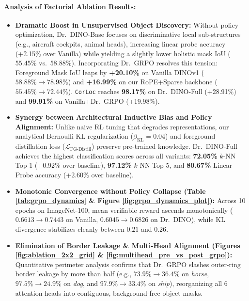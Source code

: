 \documentclass[11pt,a4paper]{article}
\begin{document}
\paragraph{Analysis of Factorial Ablation Results:}
\begin{itemize}[leftmargin=*]
    \item \textbf{Dramatic Boost in Unsupervised Object Discovery:} Without policy optimization, Dr.\ DINO-Base focuses on discriminative local sub-structures (e.g., aircraft cockpits, animal heads), increasing linear probe accuracy (+2.15\% over Vanilla) while yielding a slightly lower holistic mask IoU ($55.45\%$ vs.\ $58.88\%$). Incorporating Dr.\ GRPO resolves this tension: Foreground Mask IoU leaps by \textbf{+20.10\%} on Vanilla DINOv1 ($58.88\% \to 78.98\%$) and \textbf{+16.99\%} on our RoPE+Sparse backbone ($55.45\% \to 72.44\%$). \texttt{CorLoc} reaches \textbf{98.17\%} on Dr.\ DINO-Full (+28.91\%) and \textbf{99.91\%} on Vanilla+Dr.\ GRPO (+19.98\%).
    \item \textbf{Synergy between Architectural Inductive Bias and Policy Alignment:} Unlike naive RL tuning that degrades representations, our analytical Bernoulli KL regularization ($\beta_{\text{KL}}=0.04$) and foreground distillation loss ($\mathcal{L}_{\text{FG-Distill}}$) preserve pre-trained knowledge. Dr.\ DINO-Full achieves the highest classification scores across all variants: \textbf{72.05\%} $k$-NN Top-1 (+0.92\% over baseline), \textbf{97.12\%} $k$-NN Top-5, and \textbf{80.67\%} Linear Probe accuracy (+2.60\% over baseline).
    \item \textbf{Monotonic Convergence without Policy Collapse (Table \ref{tab:grpo_dynamics} \& Figure \ref{fig:grpo_dynamics_plot}):} Across 10 epochs on ImageNet-100, mean verifiable reward ascends monotonically ($0.6613 \to 0.7443$ on Vanilla, $0.6045 \to 0.6826$ on Dr.\ DINO), while KL divergence stabilizes cleanly between $0.21$ and $0.26$.
    \item \textbf{Elimination of Border Leakage \& Multi-Head Alignment (Figures \ref{fig:ablation_2x2_grid} \& \ref{fig:multihead_pre_vs_post_grpo}):} Quantitative perimeter analysis confirms that Dr.\ GRPO slashes outer-ring border leakage by more than half (e.g., $73.9\% \to 36.4\%$ on \textit{horse}, $97.5\% \to 24.9\%$ on \textit{dog}, and $97.9\% \to 33.4\%$ on \textit{ship}), reorganizing all 6 attention heads into contiguous, background-free object masks.
\end{itemize}

\end{document}
